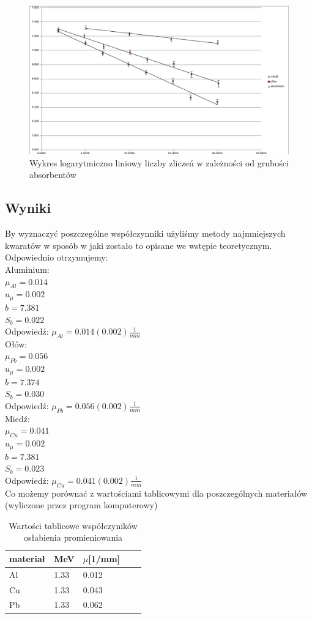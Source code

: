 \documentclass[a4paper]{article}
\begin{document}
\begin{figure}[h!]
\centering
\includegraphics[scale=0.51]{ln_x_wykres.png}
\caption{Wykres logarytmiczno liniowy liczby zliczeń w zależności od grubości absorbentów}
\label{uklad_pomiarowy}
\end{figure}

\newpage
\subsection{Wyniki}
By wyznaczyć poszczególne współczynniki użyliśmy metody najmniejszych kwaratów w sposób w jaki zostało to opisane we wstępie teoretycznym. Odpowiednio otrzymujemy: \\
Aluminium:\\
$\mu_{Al} = 0.014$\\
$u_{\mu} = 0.002$\\
$b = 7.381$\\
$S_{b} = 0.022$\\
Odpowiedź: $\mu_{Al} = 0.014(0.002) \frac{1}{mm}$\\
Ołów:\\
$\mu_{Pb} = 0.056$\\
$u_{\mu} = 0.002$\\
$b = 7.374$\\
$S_{b} = 0.030$\\

Odpowiedź: $\mu_{Pb} = 0.056(0.002) \frac{1}{mm}$\\
Miedź:\\
$\mu_{Cu} = 0.041$\\
$u_{\mu} = 0.002$\\
$b = 7.381$\\
$S_{b} = 0.023$\\
Odpowiedź: $\mu_{Cu} = 0.041(0.002) \frac{1}{mm}$ \\
Co możemy porównać z wartościami tablicowymi dla poszczególnych materiałów (wyliczone przez program komputerowy)
\begin{table}[h!]
\centering
\begin{tabular}{ | l | l | l | l | l | }
\hline
materiał & MeV & $\mu$[1/mm] \\ \hline
Al & 1.33 & 0.012 \\ \hline  
Cu & 1.33 & 0.043 \\ \hline  
Pb & 1.33 & 0.062 \\ \hline  
\end{tabular}
\caption{Wartości tablicowe współczyników osłabienia promieniowania}
\label{pomiary_sruba}
\end{table}
\newpage
\end{document}
